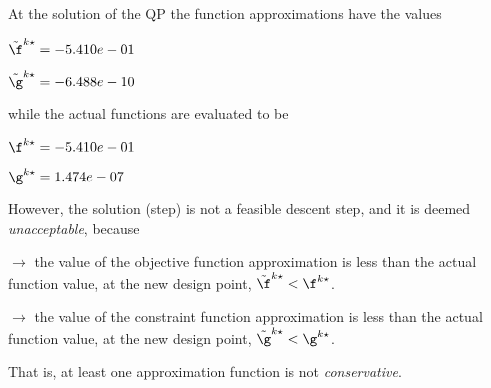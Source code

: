 At the solution of the QP the function approximations have the values

$\tilde \f^{k\star} = -5.410e-01$

$\tilde \g^{k\star} = -6.488e-10$

\bigskip
while the actual functions are evaluated to be

$\f^{k\star} = -5.410e-01$

$\g^{k\star} =  1.474e-07$

\bigskip
 However, the solution (step)                         is not a feasible descent step, and it is deemed                         \emph{unacceptable}, because 
 
$\to$ the value of the objective                             function approximation is less than the actual function                             value, at the new design point,                             $\tilde {\f}^{k\star} < {\f}^{k\star}$.

 $\to$ the value of the constraint function                             approximation is less than the actual function value, at                             the new design point, $\tilde {\g}^{k\star} < {\g}^{k\star}$.

 \bigskip 

 That is, at least one approximation                         function is not \emph{conservative}.
